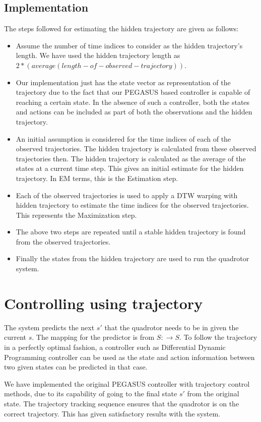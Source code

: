 \documentclass[hidelinks,BTech]{iitmdiss}
\begin{document}
\subsection{Implementation}
The steps followed for estimating the hidden trajectory are given as follows:
\begin{itemize}
	\item Assume the number of time indices to consider as the hidden trajectory's length. We have used the hidden trajectory length as $2*(average(length-of-observed-trajectory))$.
	\item Our implementation just has the state vector as representation of the trajectory due to the fact that our PEGASUS based controller is capable of reaching a certain state. In the absence of such a controller, both the states and actions can be included as part of both the observations and the hidden trajectory.
	\item An initial assumption is considered for the time indices of each of the observed trajectories. The hidden trajectory is calculated from these observed trajectories then. The hidden trajectory is calculated as the average of the states at a current time step. This gives an initial estimate for the hidden trajectory. In EM terms, this is the Estimation step.
	\item Each of the observed trajectories is used to apply a DTW warping with hidden trajectory to estimate the time indices for the observed trajectories. This represents the Maximization step.
	\item The above two steps are repeated until a stable hidden trajectory is found from the observed trajectories.
	\item Finally the states from the hidden trajectory are used to run the quadrotor system.
\end{itemize}

\section{Controlling using trajectory}
The system predicts the next $s'$ that the quadrotor needs to be in given the current $s$. The mapping for the predictor is from $S: \rightarrow S$. To follow the trajectory in a perfectly optimal fashion, a controller such as Differential Dynamic Programming controller can be used as the state and action information between two given states can be predicted in that case.

We have implemented the original PEGASUS controller with trajectory control methods, due to its capability of going to the final state $s'$ from the original state. The trajectory tracking sequence ensures that the quadrotor is on the correct trajectory. This has given satisfactory results with the system.
\end{document}
